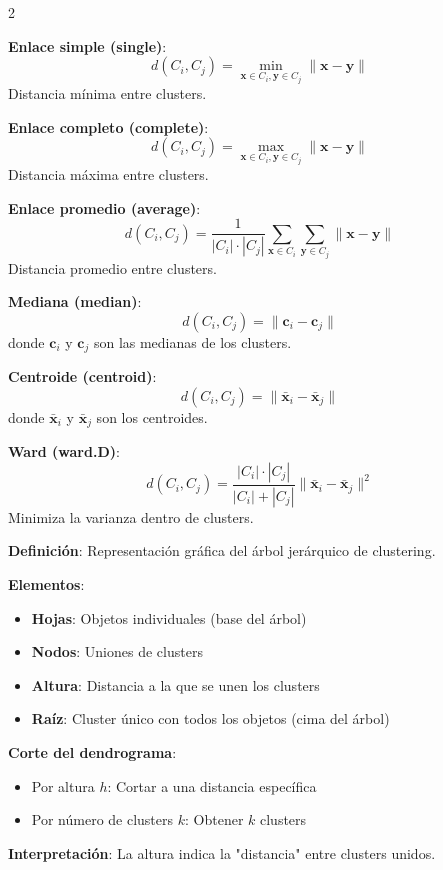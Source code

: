 \documentclass[10pt,a4paper]{article}
\begin{document}
\begin{multicols}{2}
    \begin{tcolorbox}[title=Métodos de Enlace, equal height group=CL3]
        \textbf{Enlace simple (single)}:
        \[
            d(C_i, C_j) = \min_{\mathbf{x} \in C_i, \mathbf{y} \in C_j} \|\mathbf{x} - \mathbf{y}\|
        \]
        Distancia mínima entre clusters.
        
        \textbf{Enlace completo (complete)}:
        \[
            d(C_i, C_j) = \max_{\mathbf{x} \in C_i, \mathbf{y} \in C_j} \|\mathbf{x} - \mathbf{y}\|
        \]
        Distancia máxima entre clusters.
        
        \textbf{Enlace promedio (average)}:
        \[
            d(C_i, C_j) = \frac{1}{|C_i| \cdot |C_j|} \sum_{\mathbf{x} \in C_i} \sum_{\mathbf{y} \in C_j} \|\mathbf{x} - \mathbf{y}\|
        \]
        Distancia promedio entre clusters.
    \end{tcolorbox}
    \begin{tcolorbox}[title=Métodos de Enlace (cont.), equal height group=CL3]
        \textbf{Mediana (median)}:
        \[
            d(C_i, C_j) = \|\mathbf{c}_i - \mathbf{c}_j\|
        \]
        donde $\mathbf{c}_i$ y $\mathbf{c}_j$ son las medianas de los clusters.
        
        \textbf{Centroide (centroid)}:
        \[
            d(C_i, C_j) = \|\bar{\mathbf{x}}_i - \bar{\mathbf{x}}_j\|
        \]
        donde $\bar{\mathbf{x}}_i$ y $\bar{\mathbf{x}}_j$ son los centroides.
        
        \textbf{Ward (ward.D)}:
        \[
            d(C_i, C_j) = \frac{|C_i| \cdot |C_j|}{|C_i| + |C_j|} \|\bar{\mathbf{x}}_i - \bar{\mathbf{x}}_j\|^2
        \]
        Minimiza la varianza dentro de clusters.
    \end{tcolorbox}
\end{multicols}

\begin{tcolorbox}[title=Dendrograma]
    \textbf{Definición}: Representación gráfica del árbol jerárquico de clustering.
    
    \textbf{Elementos}:
    \begin{itemize}
        \item \textbf{Hojas}: Objetos individuales (base del árbol)
        \item \textbf{Nodos}: Uniones de clusters
        \item \textbf{Altura}: Distancia a la que se unen los clusters
        \item \textbf{Raíz}: Cluster único con todos los objetos (cima del árbol)
    \end{itemize}
    
    \textbf{Corte del dendrograma}:
    \begin{itemize}
        \item Por altura $h$: Cortar a una distancia específica
        \item Por número de clusters $k$: Obtener $k$ clusters
    \end{itemize}
    
    \textbf{Interpretación}: La altura indica la "distancia" entre clusters unidos.
\end{tcolorbox}
\end{document}
